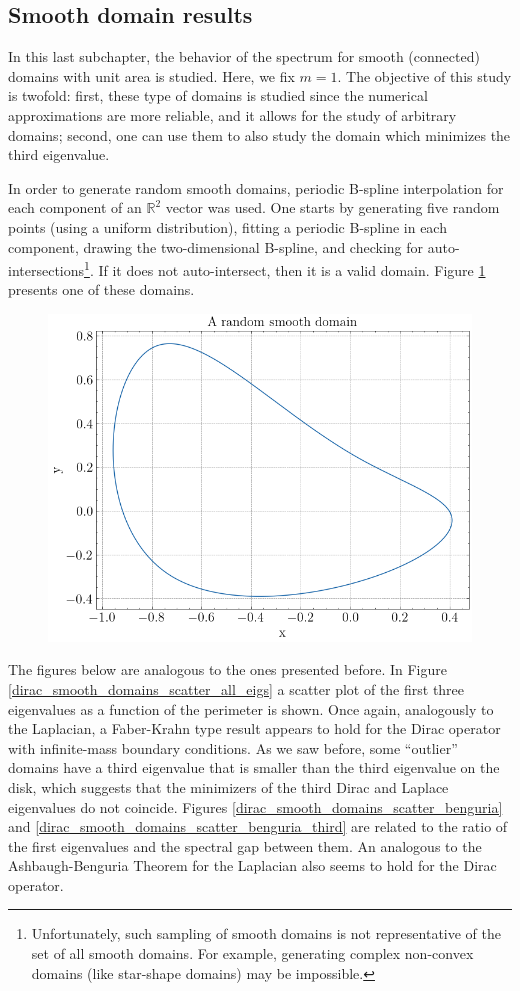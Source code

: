 \subsection{Smooth domain results}

In this last subchapter, the behavior of the spectrum for smooth (connected) domains with unit area is studied. Here, we fix \(m=1\). The objective of this study is twofold: first, these type of domains is studied since the numerical approximations are more reliable, and it allows for the study of arbitrary domains; second, one can use them to also study the domain which minimizes the third eigenvalue.

In order to generate random smooth domains, periodic B-spline interpolation for each component of an \(\mathbb{R}^2\) vector was used. One starts by generating five random points (using a uniform distribution), fitting a periodic B-spline in each component, drawing the two-dimensional B-spline, and checking for auto-intersections\footnote{Unfortunately, such sampling of smooth domains is not representative of the set of all smooth domains. For example, generating complex non-convex domains (like star-shape domains) may be impossible.}. If it does not auto-intersect, then it is a valid domain. Figure \ref{dirac_smooth_random_domain} presents one of these domains.

\begin{figure}[!htb]
    \centering
    \includegraphics[width=0.55\linewidth]{Images/Dirac/smooth/random_smooth_domain.png}
    \label{dirac_smooth_random_domain}
\end{figure}

The figures below are analogous to the ones presented before. In Figure \ref{dirac_smooth_domains_scatter_all_eigs} a scatter plot of the first three eigenvalues as a function of the perimeter is shown. Once again, analogously to the Laplacian, a Faber-Krahn type result appears to hold for the Dirac operator with infinite-mass boundary conditions. As we saw before, some ``outlier'' domains have a third eigenvalue that is smaller than the third eigenvalue on the disk, which suggests that the minimizers of the third Dirac and Laplace eigenvalues do not coincide.
Figures \ref{dirac_smooth_domains_scatter_benguria} and \ref{dirac_smooth_domains_scatter_benguria_third} are related to the ratio of the first eigenvalues and the spectral gap between them. An analogous to the Ashbaugh-Benguria Theorem for the Laplacian also seems to hold for the Dirac operator.

